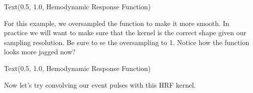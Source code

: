 \documentclass[letterpaper,10pt,english]{sphinxmanual}
\begin{document}
\begin{sphinxVerbatim}[commandchars=\\\{\}]
Text(0.5, 1.0, \PYGZsq{}Hemodynamic Response Function\PYGZsq{})
\end{sphinxVerbatim}

\noindent{}

For this example, we oversampled the function to make it more smooth.  In practice we will want to make sure that the kernel is the correct shape given our sampling resolution.  Be sure to se the oversampling to 1.  Notice how the function looks more jagged now?

\begin{sphinxVerbatim}[commandchars=\\\{\}]
   
  
 
 
 
\end{sphinxVerbatim}

\begin{sphinxVerbatim}[commandchars=\\\{\}]
Text(0.5, 1.0, \PYGZsq{}Hemodynamic Response Function\PYGZsq{})
\end{sphinxVerbatim}

\noindent{}

Now let’s try convolving our event pulses with this HRF kernel.
\end{document}
